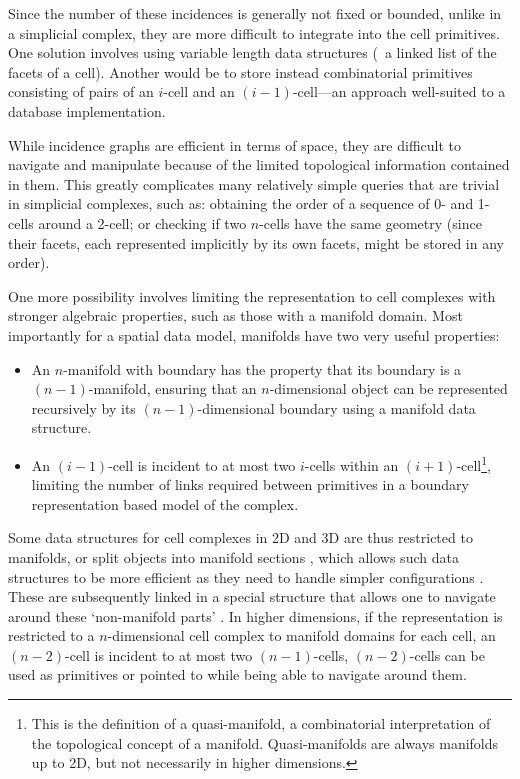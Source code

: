 Since the number of these incidences is generally not fixed or bounded, unlike in a simplicial complex, they are more difficult to integrate into the cell primitives.
One solution involves using variable length data structures (\eg\ a linked list of the facets of a cell).
Another would be to store instead combinatorial primitives consisting of pairs of an $i$-cell and an $(i-1)$-cell---an approach well-suited to a database implementation.

While incidence graphs are efficient in terms of space, they are difficult to navigate and manipulate because of the limited topological information contained in them.
This greatly complicates many relatively simple queries that are trivial in simplicial complexes, such as: obtaining the order of a sequence of 0- and 1-cells around a 2-cell; or checking if two $n$-cells have the same geometry (since their facets, each represented implicitly by its own facets, might be stored in any order).

One more possibility involves limiting the representation to cell complexes with stronger algebraic properties, such as those with a manifold domain.
Most importantly for a spatial data model, manifolds have two very useful properties:
\begin{itemize}
\item
An $n$-manifold with boundary has the property that its boundary is a $(n-1)$-manifold, ensuring that an $n$-dimensional object can be represented recursively by its $(n-1)$-dimensional boundary using a manifold data structure.
\item
An $(i-1)$-cell is incident to at most two $i$-cells within an $(i+1)$-cell\footnote{This is the definition of a quasi-manifold, a combinatorial interpretation of the topological concept of a manifold. Quasi-manifolds are always manifolds up to 2D, but not necessarily in higher dimensions.}, limiting the number of links required between primitives in a boundary representation based model of the complex.
\end{itemize}

Some data structures for cell complexes in 2D and 3D are thus restricted to manifolds, or split objects into manifold sections \citep{Pesco04,Lopes97}, which allows such data structures to be more efficient as they need to handle simpler configurations \citep{Aguila03}.
These are subsequently linked in a special structure that allows one to navigate around these `non-manifold parts' \citep{Weiler88,Gursoz90,Lee01}.
In higher dimensions, if the representation is restricted to a $n$-dimensional cell complex to manifold domains for each cell, an $(n-2)$-cell is incident to at most two $(n-1)$-cells, $(n-2)$-cells can be used as primitives or pointed to while being able to navigate around them.

